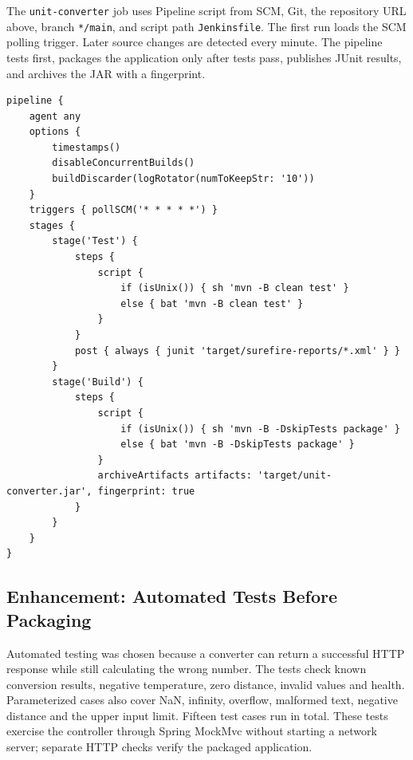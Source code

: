 \documentclass[12pt,a4paper]{article}
\begin{document}
The \texttt{unit-converter} job uses Pipeline script from SCM, Git, the repository URL above, branch \texttt{*/main}, and script path \texttt{Jenkinsfile}. The first run loads the SCM polling trigger. Later source changes are detected every minute. The pipeline tests first, packages the application only after tests pass, publishes JUnit results, and archives the JAR with a fingerprint.

\par\medskip{}\noindent\textbf{}\par\smallskip

\begin{lstlisting}
pipeline {
    agent any
    options {
        timestamps()
        disableConcurrentBuilds()
        buildDiscarder(logRotator(numToKeepStr: '10'))
    }
    triggers { pollSCM('* * * * *') }
    stages {
        stage('Test') {
            steps {
                script {
                    if (isUnix()) { sh 'mvn -B clean test' }
                    else { bat 'mvn -B clean test' }
                }
            }
            post { always { junit 'target/surefire-reports/*.xml' } }
        }
        stage('Build') {
            steps {
                script {
                    if (isUnix()) { sh 'mvn -B -DskipTests package' }
                    else { bat 'mvn -B -DskipTests package' }
                }
                archiveArtifacts artifacts: 'target/unit-converter.jar', fingerprint: true
            }
        }
    }
}
\end{lstlisting}

\subsection*{Enhancement: Automated Tests Before Packaging}

Automated testing was chosen because a converter can return a successful HTTP response while still calculating the wrong number. The tests check known conversion results, negative temperature, zero distance, invalid values and health. Parameterized cases also cover NaN, infinity, overflow, malformed text, negative distance and the upper input limit. Fifteen test cases run in total. These tests exercise the controller through Spring MockMvc without starting a network server; separate HTTP checks verify the packaged application.

\par\medskip{}\noindent\textbf{}\par\smallskip
\end{document}
